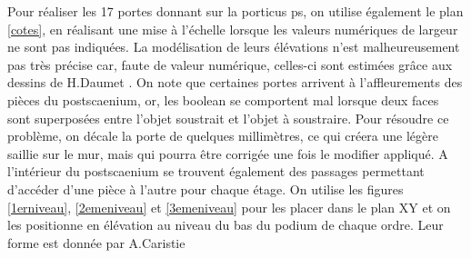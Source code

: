 Pour réaliser les 17 portes donnant sur la \gls{porticus ps}, on utilise également le plan \ref{cotes}, en réalisant une mise à l'échelle lorsque les valeurs numériques de largeur ne sont pas indiquées. La modélisation de leurs élévations n'est malheureusement pas très précise car, faute de valeur numérique, celles-ci sont estimées grâce aux dessins de H.Daumet \cite[Pl. XII, XIII, XIV]{orangePl}. On note que certaines portes arrivent à l'affleurements des pièces du \gls{postscaenium}, or, les \gls{boolean} se comportent mal lorsque deux faces sont superposées entre l'objet soustrait et l'objet à soustraire. Pour résoudre ce problème, on décale la porte de quelques millimètres, ce qui créera une légère saillie sur le mur, mais qui pourra être corrigée une fois le modifier appliqué. A l'intérieur du \gls{postscaenium} se trouvent également des passages permettant d'accéder d'une pièce à l'autre pour chaque étage. On utilise les figures \ref{1erniveau}, \ref{2emeniveau} et \ref{3emeniveau} pour les placer dans le plan XY et on les positionne en élévation au niveau du bas du \gls{podium} de chaque ordre. Leur forme est donnée par A.Caristie \cite[Pl. II]{orangePl}

